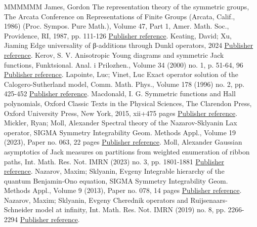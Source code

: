 \begin{thebibliography}{MMMMMM}
 James, Gordon The representation theory of the symmetric groups, The Arcata Conference on Representations of Finite Groups (Arcata, Calif., 1986) (Proc. Sympos. Pure Math.), Volume 47, Part 1, Amer. Math. Soc., Providence, RI, 1987, pp. 111-126 \href{https://alco.centre-mersenne.org/articles/10.5802/alco.451/#james2006representation}{Publisher reference}.
 Keating, David; Xu, Jiaming Edge universality of β-additions through Dunkl operators, 2024 \href{https://alco.centre-mersenne.org/articles/10.5802/alco.451/#KX2024}{Publisher reference}.
 Kerov, S. V. Anisotropic Young diagrams and symmetric Jack functions, Funktsional. Anal. i Prilozhen., Volume 34 (2000) no. 1, p. 51-64, 96 \href{https://alco.centre-mersenne.org/articles/10.5802/alco.451/#kerov2000anisotropic}{Publisher reference}.
 Lapointe, Luc; Vinet, Luc Exact operator solution of the Calogero-Sutherland model, Comm. Math. Phys., Volume 178 (1996) no. 2, pp. 425-452 \href{https://alco.centre-mersenne.org/articles/10.5802/alco.451/#lapointe1996exact}{Publisher reference}.
 Macdonald, I. G. Symmetric functions and Hall polynomials, Oxford Classic Texts in the Physical Sciences, The Clarendon Press, Oxford University Press, New York, 2015, xii+475 pages \href{https://alco.centre-mersenne.org/articles/10.5802/alco.451/#macdonald1998symmetric}{Publisher reference}.
 Mickler, Ryan; Moll, Alexander Spectral theory of the Nazarov-Sklyanin Lax operator, SIGMA Symmetry Integrability Geom. Methods Appl., Volume 19 (2023), Paper no. 063, 22 pages \href{https://alco.centre-mersenne.org/articles/10.5802/alco.451/#mickler2023spectral}{Publisher reference}.
 Moll, Alexander Gaussian asymptotics of Jack measures on partitions from weighted enumeration of ribbon paths, Int. Math. Res. Not. IMRN (2023) no. 3, pp. 1801-1881 \href{https://alco.centre-mersenne.org/articles/10.5802/alco.451/#moll2023gaussian}{Publisher reference}.
 Nazarov, Maxim; Sklyanin, Evgeny Integrable hierarchy of the quantum Benjamin-Ono equation, SIGMA Symmetry Integrability Geom. Methods Appl., Volume 9 (2013), Paper no. 078, 14 pages \href{https://alco.centre-mersenne.org/articles/10.5802/alco.451/#nazarov2013integrable}{Publisher reference}.
 Nazarov, Maxim; Sklyanin, Evgeny Cherednik operators and Ruijsenaars-Schneider model at infinity, Int. Math. Res. Not. IMRN (2019) no. 8, pp. 2266-2294 \href{https://alco.centre-mersenne.org/articles/10.5802/alco.451/#nazarov2019cherednik}{Publisher reference}.

\end{thebibliography}
